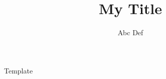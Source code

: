 \documentclass{article}
\title{My Title}
\author{Abc Def}
\date{}
\begin{document}
\maketitle

Template
\end{document}
